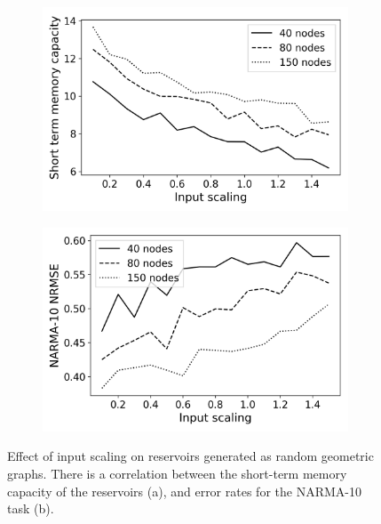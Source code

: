 \begin{figure}[t]
  \centering
  \begin{subfigure}{.49\textwidth}
    \centering
    \includegraphics[width=1.0\linewidth]{figures/RGG-dist-mc.png}
    \caption{}
    \label{fig:dist-performance-is-a}
  \end{subfigure}
  \begin{subfigure}{.49\textwidth}
    \centering
    \includegraphics[width=1.0\linewidth]{figures/RGG-dist-performance-is.png}
    \caption{}
    \label{fig:dist-performance-is-b}
  \end{subfigure}
  \caption{
    Effect of input scaling on reservoirs generated as random geometric
graphs. There is a correlation between the short-term memory capacity of the
reservoirs (a), and error rates for the NARMA-10 task (b).
  }
  \label{fig:dist-performance-is}
\end{figure}

